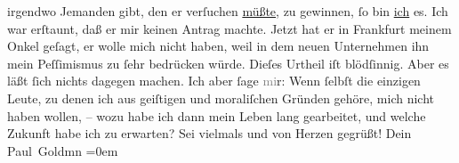 \begin{ledgroupsized}[t]{13cm}
               irgendwo Jemanden gibt, den er verſuchen \uline{müßte}, zu
               gewinnen, ſo bin \uline{ich} es. Ich war erſtaunt, daß er mir
               keinen Antrag machte. Jetzt hat er in {\pb}Frankfurt meinem Onkel geſagt, er wolle mich nicht haben,
               weil in dem neuen Unternehmen
               ihn mein Peſſimismus zu ſehr bedrücken würde. 
               Dieſes Urtheil iſt blödſinnig. Aber es läßt ſich nichts dagegen machen. Ich aber ſage
                  \textcolor{gray}{mi}r: Wenn ſelbſt die einzigen Leute,  zu denen ich aus geiſtigen und moraliſchen Gründen gehöre,
               mich nicht haben wollen, – wozu habe ich dann mein Leben lang gearbeitet, und welche
               Zukunft habe ich zu erwarten?\pend
           \pstart
           Sei vielmals und von Herzen gegrüßt! Dein {\\[\baselineskip]}\spacefill\mbox{Paul Goldmn}\pend
           \leftskip=0em{}
         
         \endnumbering{}\end{ledgroupsized}  \newcommand{\dateiname}{L03195}\newcommand{\titel}{Paul Goldmann an Arthur Schnitzler, 25. 1. [1902]}\newcommand{\editorInnen}{Martin Anton Müller und Laura Untner}
      